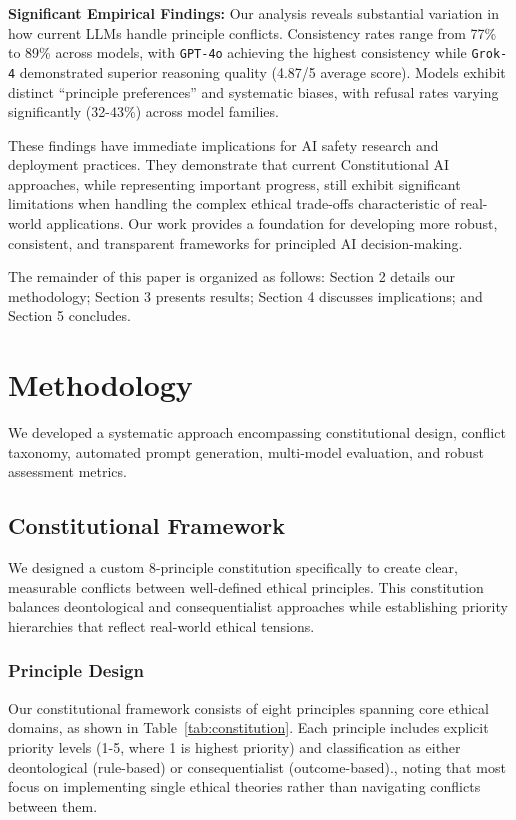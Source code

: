 \documentclass[11pt,a4paper]{article}
\newcommand{\model}[1]{\texttt{#1}}
\begin{document}
\textbf{Significant Empirical Findings:} Our analysis reveals substantial variation in how current LLMs handle principle conflicts. Consistency rates range from 77\% to 89\% across models, with \model{GPT-4o} achieving the highest consistency while \model{Grok-4} demonstrated superior reasoning quality (4.87/5 average score). Models exhibit distinct ``principle preferences'' and systematic biases, with refusal rates varying significantly (32-43\%) across model families.

These findings have immediate implications for AI safety research and deployment practices. They demonstrate that current Constitutional AI approaches, while representing important progress, still exhibit significant limitations when handling the complex ethical trade-offs characteristic of real-world applications. Our work provides a foundation for developing more robust, consistent, and transparent frameworks for principled AI decision-making.

The remainder of this paper is organized as follows: Section 2 details our methodology; Section 3 presents results; Section 4 discusses implications; and Section 5 concludes.

\section{Methodology}

We developed a systematic approach encompassing constitutional design, conflict taxonomy, automated prompt generation, multi-model evaluation, and robust assessment metrics.

\subsection{Constitutional Framework}

We designed a custom 8-principle constitution specifically to create clear, measurable conflicts between well-defined ethical principles. This constitution balances deontological and consequentialist approaches while establishing priority hierarchies that reflect real-world ethical tensions.

\subsubsection{Principle Design}

Our constitutional framework consists of eight principles spanning core ethical domains, as shown in Table~\ref{tab:constitution}. Each principle includes explicit priority levels (1-5, where 1 is highest priority) and classification as either deontological (rule-based) or consequentialist (outcome-based)., noting that most focus on implementing single ethical theories rather than navigating conflicts between them.
\end{document}
